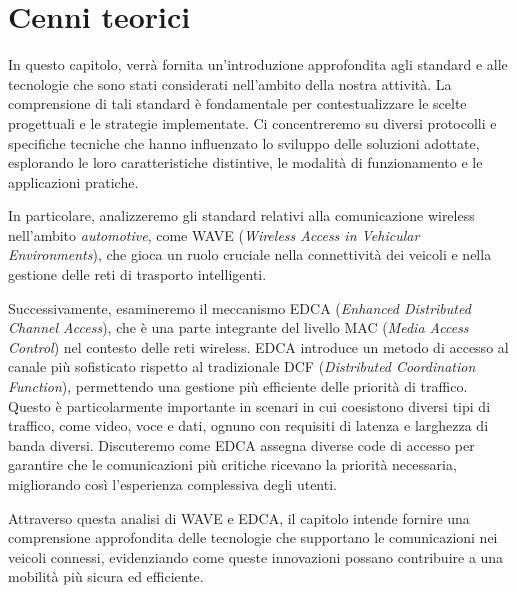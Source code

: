 \chapter{Cenni teorici}

In questo capitolo, verrà fornita un'introduzione approfondita agli standard e alle tecnologie che sono stati considerati nell'ambito della nostra attività. La comprensione di tali standard è fondamentale per contestualizzare le scelte progettuali e le strategie implementate. Ci concentreremo su diversi protocolli e specifiche tecniche che hanno influenzato lo sviluppo delle soluzioni adottate, esplorando le loro caratteristiche distintive, le modalità di funzionamento e le applicazioni pratiche.

In particolare, analizzeremo gli standard relativi alla comunicazione wireless nell'ambito \textit{automotive}, come WAVE (\textit{Wireless Access in Vehicular Environments}), che gioca un ruolo cruciale nella connettività dei veicoli e nella gestione delle reti di trasporto intelligenti. 

Successivamente, esamineremo il meccanismo EDCA (\textit{Enhanced Distributed Channel Access}), che è una parte integrante del livello MAC (\textit{Media Access Control}) nel contesto delle reti wireless. EDCA introduce un metodo di accesso al canale più sofisticato rispetto al tradizionale DCF (\textit{Distributed Coordination Function}), permettendo una gestione più efficiente delle priorità di traffico. Questo è particolarmente importante in scenari in cui coesistono diversi tipi di traffico, come video, voce e dati, ognuno con requisiti di latenza e larghezza di banda diversi. Discuteremo come EDCA assegna diverse code di accesso per garantire che le comunicazioni più critiche ricevano la priorità necessaria, migliorando così l'esperienza complessiva degli utenti.

Attraverso questa analisi di WAVE e EDCA, il capitolo intende fornire una comprensione approfondita delle tecnologie che supportano le comunicazioni nei veicoli connessi, evidenziando come queste innovazioni possano contribuire a una mobilità più sicura ed efficiente.



